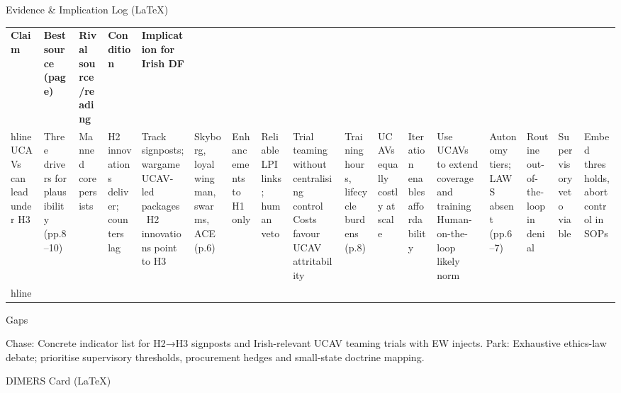 Evidence & Implication Log (LaTeX)

\usepackage{array}

\begin{tabular}{p{3.2cm}p{4.2cm}p{3.6cm}p{3.2cm}p{4.2cm}}
	\textbf{Claim} & \textbf{Best source (page)} & \textbf{Rival source/reading} & \textbf{Condition} & \textbf{Implication for Irish DF}\\hline
	UCAVs can lead under H3 & Three drivers for plausibility (pp.8–10) & Manned core persists & H2 innovations deliver; counters lag & Track signposts; wargame UCAV-led packages\
	H2 innovations point to H3 & Skyborg, loyal wingman, swarms, ACE (p.6) & Enhancements to H1 only & Reliable LPI links; human veto & Trial teaming without centralising control\
	Costs favour UCAV attritability & Training hours, lifecycle burdens (p.8) & UCAVs equally costly at scale & Iteration enables affordability & Use UCAVs to extend coverage and training\
	Human-on-the-loop likely norm & Autonomy tiers; LAWS absent (pp.6–7) & Routine out-of-the-loop in denial & Supervisory veto viable & Embed thresholds, abort control in SOPs\\hline
\end{tabular}

Gaps

Chase: Concrete indicator list for H2→H3 signposts and Irish-relevant UCAV teaming trials with EW injects.
Park: Exhaustive ethics-law debate; prioritise supervisory thresholds, procurement hedges and small-state doctrine mapping.

\parencite{GHOSH_2001}
DIMERS Card (LaTeX)

